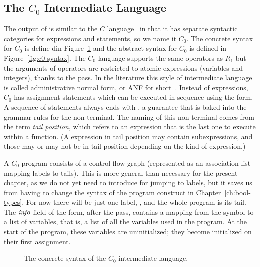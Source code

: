 \documentclass[11pt]{book}
\begin{document}
\subsection{The $C_0$ Intermediate Language}

The output of  is similar to the $C$
language~\citep{Kernighan:1988nx} in that it has separate syntactic
categories for expressions and statements, so we name it $C_0$.  The
concrete syntax for $C_0$ is define din
Figure~\ref{fig:c0-concrete-syntax} and the abstract syntax for $C_0$
is defined in Figure~\ref{fig:c0-syntax}.
%
The $C_0$ language supports the same operators as $R_1$ but the
arguments of operators are restricted to atomic expressions (variables
and integers), thanks to the  pass.  In the
literature this style of intermediate language is called
administrative normal form, or ANF for
short~\citep{Danvy:1991fk,Flanagan:1993cg}.  Instead of 
expressions, $C_0$ has assignment statements which can be executed in
sequence using the  form. A sequence of statements always
ends with , a guarantee that is baked into the grammar
rules for the  non-terminal. The naming of this non-terminal
comes from the term \emph{tail position}, which refers to an
expression that is the last one to execute within a function. (A
expression in tail position may contain subexpressions, and those may
or may not be in tail position depending on the kind of expression.)

A $C_0$ program consists of a control-flow graph (represented as an
association list mapping labels to tails). This is more general than
necessary for the present chapter, as we do not yet need to introduce
 for jumping to labels, but it saves us from having to
change the syntax of the program construct in
Chapter~\ref{ch:bool-types}.  For now there will be just one label,
, and the whole program is its tail.
%
The $\mathit{info}$ field of the  form, after the
 pass, contains a mapping from the symbol
 to a list of variables, that is, a list of all the
variables used in the program. At the start of the program, these
variables are uninitialized; they become initialized on their first
assignment.

\begin{figure}[tbp]
\caption{The concrete syntax of the $C_0$ intermediate language.}
\label{fig:c0-concrete-syntax}
\end{figure}
\end{document}
